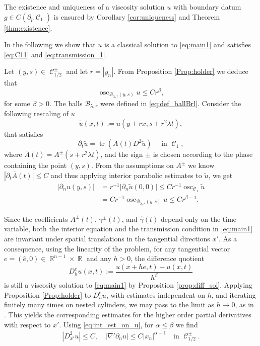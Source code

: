\documentclass[12pt]{article}
\makeatletter
\newenvironment{customproof}[1]{%
  \par\pushQED{\qed}%
  \normalfont\topsep6pt \trivlist
  \item[\hskip\labelsep\itshape
    Proof of #1\@addpunct{.}]\ignorespaces
}{%
  \popQED\endtrivlist\@endpefalse
}
\numberwithin{Theorem}{section}
\theoremstyle{definition}
\theoremstyle{remark}
\numberwithin{equation}{section}
\DeclareMathOperator{\C}{\mathcal{C}}
\DeclareMathOperator{\R}{\mathbb{R}}
\DeclareMathOperator*{\tr}{tr}
\newcommand{\p}{\partial}
\newcommand{\osc}{\operatorname{osc}}
\makeatother
\begin{document}
\begin{customproof}{Theorem \ref{Thm:C1gamma}} 
The existence and uniqueness of a viscosity solution $u$ with boundary datum $g \in C(\p_p \C_1)$ is ensured by Corollary \ref{cor:uniqueness} and Theorem \ref{thm:existence}. 

In the following we show that $u$ is a classical solution to \eqref{eq:main1} and satisfies \eqref{eq:C11} and \eqref{eq:transmission_1}.

Let $(y,s) \in \C_{1/2}^{\pm}$ and let $r=|y_n|$. From Proposition \ref{Prop:holder} we deduce that
$$
\osc_{\mathcal{B}_{\lambda,r}(y,s)} u \leq C r^{{ \beta}},$$
for some ${\beta}>0$. The balls $\mathcal{B}_{\lambda,r}$ were defined in \eqref{eq:def_ballBrl}. Consider the following rescaling of $u$
$$
\tilde u(x,t):=u(y+rx,s+r^2\lambda t),
$$
that satisfies
$$
\p_t \tilde{u} = \tr \left( \overline{A}(t) D^2 \tilde{u} \right) \quad \text{ in } \C_1,
$$
where $\overline{A}(t)=A^\pm(s+r^2\lambda t)$, and the sign $\pm$ is chosen according to the phase containing the point $(y,s)$. From the assumptions on $A^{\pm}$ we know $|\p_t \overline{A}(t)| \leq C$ and thus applying interior parabolic estimates to $\tilde u$, we get
\begin{equation} \label{eq:int_est_on_u}     \begin{aligned}     \vert{}\p_n u(y,s)\vert{} &= r^{-1}\vert{}\p_n \tilde{u}(0,0)\vert{} \leq Cr^{-1}\osc_{\C_1} \tilde u \\     &= Cr^{-1}\osc_{\mathcal{B}_{\lambda,r}(y,s)} u \leq Cr^{{ \beta}-1}.     
\end{aligned} \end{equation}


Since the coefficients $A^\pm(t)$, $\gamma^\pm(t)$, and $\hat{\gamma}(t)$ depend only on the time variable, both the interior equation and the transmission condition in \eqref{eq:main1} are invariant under spatial translations in the tangential directions $x'$. 
As a consequence, using the linearity of the problem, for any tangential vector $e=(\hat e,0) \in \R^{n-1}\times \R$ and any $h>0$, the difference quotient 
$$ D_h^e u(x,t) := \frac{u(x+he, t) - u(x,t)}{h^\beta} $$
is still a viscosity solution to \eqref{eq:main1} by Proposition \ref{prop:diff_sol}. 
Applying Proposition \ref{Prop:holder} to $D_h^e u$, with estimates independent on $h$, and iterating finitely many times on nested cylinders, we may pass to the limit as $h \to 0$, as in \cite[Corollary 5.7]{CC}. This yields the corresponding estimates for the higher order partial derivatives with respect to $x'$. Using \eqref{eq:int_est_on_u}, for $\alpha \leq \beta$ we find 
\begin{align} \label{eq:mixed_bounds}
    |D_{x'}^2 u| \leq C, \quad |\nabla' \p_n u| \leq C|x_n|^{{ \alpha}-1} \quad \text{in }\C_{1/2}^{\pm}.
\end{align}






\end{customproof}
\end{document}
